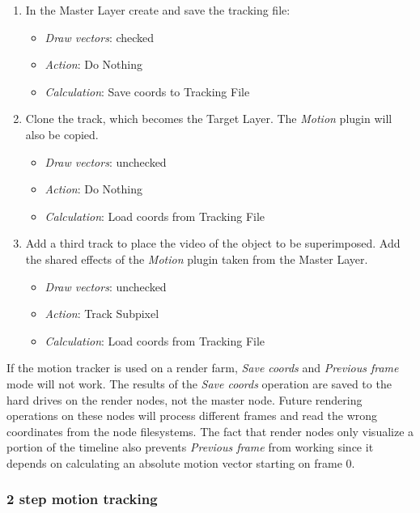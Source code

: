 \begin{enumerate}
	\item In the Master Layer create and save the tracking file:
	\begin{itemize}
		\item \textit{Draw vectors}: checked
		\item \textit{Action}: Do Nothing
		\item \textit{Calculation}: Save coords to Tracking File
	\end{itemize}
	\item Clone the track, which becomes the Target Layer. The \textit{Motion} plugin will also be copied.
		\begin{itemize}
			\item \textit{Draw vectors}: unchecked
			\item \textit{Action}: Do Nothing
			\item \textit{Calculation}: Load coords from Tracking File
		\end{itemize}
	\item Add a third track to place the video of the object to be superimposed. Add the shared effects of the \textit{Motion} plugin taken from the Master Layer.
		\begin{itemize}
			\item \textit{Draw vectors}: unchecked
			\item \textit{Action}: Track Subpixel
			\item \textit{Calculation}: Load coords from Tracking File
		\end{itemize}
\end{enumerate}

If the motion tracker is used on a render farm, \textit{Save coords} and \textit{Previous frame} mode will not work. The results of the \textit{Save coords} operation are saved to the hard drives on the render nodes, not the master node. Future rendering operations on these nodes will process different frames and read the wrong coordinates from the node filesystems. The fact that render nodes only visualize a portion of the timeline also prevents \textit{Previous frame} from working since it depends on calculating an absolute motion vector starting on frame $0$.

\subsubsection*{2 step motion tracking}
\label{ssub:2_step_motion_tracking}

